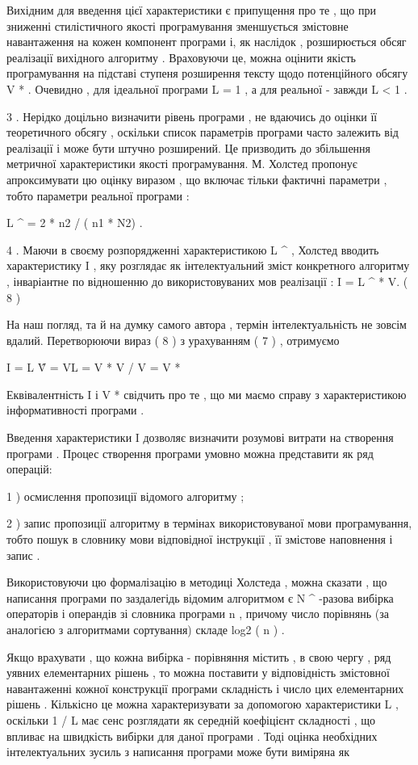 \documentclass[oneside,final,14pt]{extreport}
\begin{document}
\begin{description}
Вихідним для введення цієї характеристики є припущення про те , що при зниженні стилістичного якості програмування зменшується змістовне навантаження на кожен компонент програми і, як наслідок , розширюється обсяг реалізації вихідного алгоритму . Враховуючи це, можна оцінити якість програмування на підставі ступеня розширення тексту щодо потенційного обсягу V * . Очевидно , для ідеальної програми L = 1 , а для реальної - завжди L \textless{} 1 .

3 . Нерідко доцільно визначити рівень програми , не вдаючись до оцінки її теоретичного обсягу , оскільки список параметрів програми часто залежить від реалізації і може бути штучно розширений. Це призводить до збільшення метричної характеристики якості програмування. М. Холстед пропонує апроксимувати цю оцінку виразом , що включає тільки фактичні параметри , тобто параметри реальної програми :

L \textasciicircum{} = 2 * n2 / ( n1 * N2) .

4 . Маючи в своєму розпорядженні характеристикою L \textasciicircum{} , Холстед вводить характеристику I , яку розглядає як інтелектуальний зміст конкретного алгоритму , інваріантне по відношенню до використовуваних мов реалізації : I = L \textasciicircum{} * V. ( 8 )

На наш погляд, та й на думку самого автора , термін інтелектуальність не зовсім вдалий. Перетворюючи вираз ( 8 ) з урахуванням ( 7 ) , отримуємо

I = L \^ V = VL = V * V / V = V *

Еквівалентність I і V * свідчить про те , що ми маємо справу з характеристикою інформативності програми .

Введення характеристики I дозволяє визначити розумові витрати на створення програми . Процес створення програми умовно можна представити як ряд операцій:

1 ) осмислення пропозиції відомого алгоритму ;

2 ) запис пропозиції алгоритму в термінах використовуваної мови програмування, тобто пошук в словнику мови відповідної інструкції , її змістове наповнення і запис .

Використовуючи цю формалізацію в методиці Холстеда , можна сказати , що написання програми по заздалегідь відомим алгоритмом є N \textasciicircum{} -разова вибірка операторів і операндів зі словника програми n , причому число порівнянь (за аналогією з алгоритмами сортування) складе log2 ( n ) .

Якщо врахувати , що кожна вибірка - порівняння містить , в свою чергу , ряд уявних елементарних рішень , то можна поставити у відповідність змістовної навантаженні кожної конструкції програми складність і число цих елементарних рішень . Кількісно це можна характеризувати за допомогою характеристики L , оскільки 1 / L має сенс розглядати як середній коефіцієнт складності , що впливає на швидкість вибірки для даної програми . Тоді оцінка необхідних інтелектуальних зусиль з написання програми може бути виміряна як


\end{description}
\end{document}
